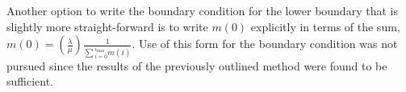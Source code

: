 \documentclass[review]{elsarticle}
\newcommand{\imax}{\ensuremath{i_{\max}}\xspace}
\begin{document}
Another option to write the boundary condition for the lower boundary that is slightly more straight-forward is to write $m(0)$ explicitly in terms of the sum, $m(0)=\left(\frac{\lambda}{\mu}\right)\frac{1}{\sum{}_{i=0}^{\imax}m(i)}$.
Use of this form for the boundary condition was not pursued since the results of the previously outlined method were found to be sufficient.







\end{document}
